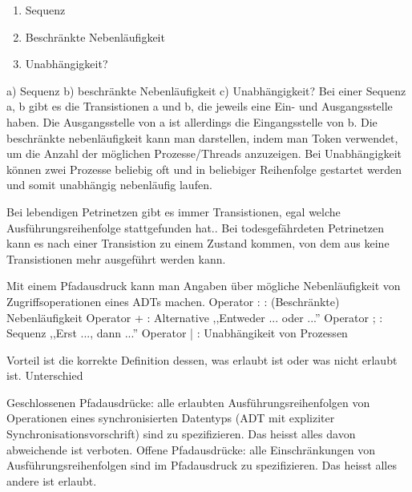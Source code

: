 \begin{multilinequestion}
\begin{enumerate}
\item Sequenz
\item Beschränkte Nebenläufigkeit
\item Unabhängigkeit?
\end{enumerate}
\end{multilinequestion}
\begin{answer}
a) Sequenz
b) beschränkte Nebenläufigkeit
c) Unabhängigkeit?
Bei einer Sequenz a, b gibt es die Transistionen a und b, die jeweils eine Ein- und Ausgangsstelle
haben. Die Ausgangsstelle von a ist allerdings die Eingangsstelle von b.
Die beschränkte nebenläufigkeit kann man darstellen, indem man Token verwendet, um die Anzahl
der möglichen Prozesse/Threads anzuzeigen.
Bei Unabhängigkeit können zwei Prozesse beliebig oft und in beliebiger Reihenfolge gestartet
werden und somit unabhängig nebenläufig laufen.
\end{answer}

\begin{answer}
Bei lebendigen Petrinetzen gibt es immer Transistionen, egal welche Ausführungsreihenfolge stattgefunden
hat..
Bei todesgefährdeten Petrinetzen kann es nach einer Transistion zu einem Zustand kommen, von
dem aus keine Transistionen mehr ausgeführt werden kann.
\end{answer}

\begin{answer}
Mit einem Pfadausdruck kann man Angaben über mögliche Nebenläufigkeit von Zugriffsoperationen
eines ADTs machen.
Operator : : (Beschränkte) Nebenläufigkeit
Operator + : Alternative ,,Entweder ... oder ...''
Operator ; : Sequenz ,,Erst ..., dann ...''
Operator | : Unabhängikeit von Prozessen
\end{answer}

\begin{answer}
Vorteil ist die korrekte Definition dessen, was erlaubt ist oder was nicht erlaubt ist. Unterschied
\end{answer}

\begin{answer}
Geschlossenen Pfadausdrücke: alle erlaubten Ausführungsreihenfolgen von Operationen eines synchronisierten
Datentyps (ADT mit expliziter Synchronisationsvorschrift) sind zu spezifizieren. Das
heisst alles davon abweichende ist verboten.
Offene Pfadausdrücke: alle Einschränkungen von Ausführungsreihenfolgen sind im Pfadausdruck
zu spezifizieren. Das heisst alles andere ist erlaubt.
\end{answer}


